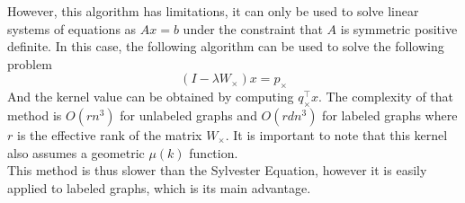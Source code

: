 \documentclass{article}
\theoremstyle{definition}
\begin{document}
However, this algorithm has limitations, it can only be used to solve linear systems of equations as $Ax=b$ under the constraint that $A$ is symmetric positive definite.
In this case, the following algorithm can be used to solve the following problem 
\begin{equation}
	(I-\lambda W_{\times})x=p_{\times}
\end{equation}
And the kernel value can be obtained by computing $q_{\times}^{\top}x$. The complexity of that method is $O(rn^3)$ for unlabeled graphs and $O(rdn^3)$ for labeled graphs where $r$ is the effective rank of the matrix $W_{\times}$. It is important to note that this kernel also assumes a geometric $\mu(k)$ function. \\
This method is thus slower than the Sylvester Equation, however it is easily applied to labeled graphs, which is its main advantage.
\end{document}
